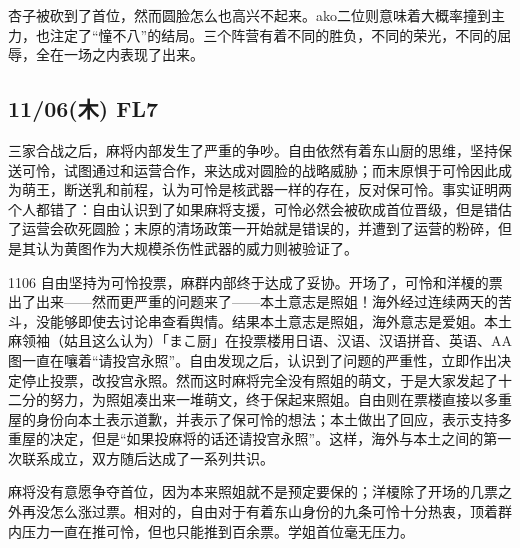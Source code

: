 杏子被砍到了首位，然而圆脸怎么也高兴不起来。ako二位则意味着大概率撞到主力，也注定了“憧不八”的结局。三个阵营有着不同的胜负，不同的荣光，不同的屈辱，全在一场之内表现了出来。

\subsection{11/06(木) FL7}


三家合战之后，麻将内部发生了严重的争吵。自由依然有着东山厨的思维，坚持保送可怜，试图通过和运营合作，来达成对圆脸的战略威胁；而末原惧于可怜因此成为萌王，断送乳和前程，认为可怜是核武器一样的存在，反对保可怜。事实证明两个人都错了：自由认识到了如果麻将支援，可怜必然会被砍成首位晋级，但是错估了运营会砍死圆脸；末原的清场政策一开始就是错误的，并遭到了运营的粉碎，但是其认为黄图作为大规模杀伤性武器的威力则被验证了。

1106 自由坚持为可怜投票，麻群内部终于达成了妥协。开场了，可怜和洋榎的票出了出来——然而更严重的问题来了——本土意志是照姐！海外经过连续两天的苦斗，没能够即使去讨论串查看舆情。结果本土意志是照姐，海外意志是爱姐。本土麻领袖（姑且这么认为）「まこ厨」在投票楼用日语、汉语、汉语拼音、英语、AA图一直在嚷着“请投宫永照”。自由发现之后，认识到了问题的严重性，立即作出决定停止投票，改投宫永照。然而这时麻将完全没有照姐的萌文，于是大家发起了十二分的努力，为照姐凑出来一堆萌文，终于保起来照姐。自由则在票楼直接以多重屋的身份向本土表示道歉，并表示了保可怜的想法；本土做出了回应，表示支持多重屋的决定，但是“如果投麻将的话还请投宫永照”。这样，海外与本土之间的第一次联系成立，双方随后达成了一系列共识。

麻将没有意愿争夺首位，因为本来照姐就不是预定要保的；洋榎除了开场的几票之外再没怎么涨过票。相对的，自由对于有着东山身份的九条可怜十分热衷，顶着群内压力一直在推可怜，但也只能推到百余票。学姐首位毫无压力。

